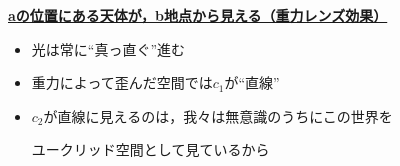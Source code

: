 \documentclass[dvipdfmx, xcolor=svgnames]{beamer}
\theoremstyle{plain}
\theoremstyle{definition}
\theoremstyle{remark}
\begin{document}
{\begin{center}
{}      
\end{center}
\pause
{\bf \underline{aの位置にある天体が，b地点から見える（重力レンズ効果）}}
\pause
\begin{itemize}
      \item 光は常に“真っ直ぐ”進む
      \item 重力によって歪んだ空間では\(c_1\)が“直線”
\pause
      \item \(c_2\)が直線に見えるのは，我々は無意識のうちにこの世界を
      
            ユークリッド空間として見ているから
\end{itemize}
}
\end{document}
